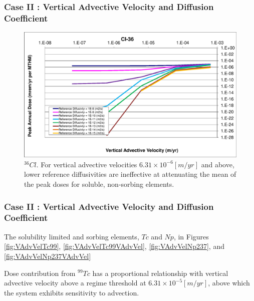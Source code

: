 \begin{frame}[c]
  \frametitle{Case II : Vertical Advective Velocity and Diffusion Coefficient}
\begin{figure}[ht!]
\centering
\includegraphics[width=\textwidth]{AdvVelAndDiffCoeffEBSFail/Cl-36-VAdvVel.eps}
\caption{$^{36}Cl$.
For vertical advective velocities 
$6.31\times10^{-6}[m/yr]$ and above, lower reference diffusivities are 
ineffective at attenuating the mean of the peak doses for soluble, non-sorbing 
elements. 
}
\label{fig:VAdvVelCl36VAdvVel}
\end{figure}
\end{frame}

\begin{frame}[c]
  \frametitle{Case II : Vertical Advective Velocity and Diffusion Coefficient}
The solubility limited and sorbing elements, $Tc$ and $Np$, in Figures 
\ref{fig:VAdvVelTc99}, \ref{fig:VAdvVelTc99VAdvVel}, \ref{fig:VAdvVelNp237}, and 
\ref{fig:VAdvVelNp237VAdvVel}

Dose contribution from $^{99}Tc$ has a proportional 
relationship with vertical advective velocity above a regime threshold at 
$6.31\times10^{-5}[m/yr]$, above which the system exhibits sensitivity to 
advection. 

\end{frame}

